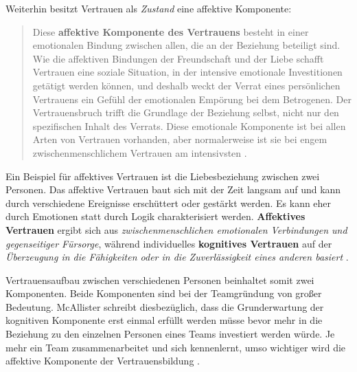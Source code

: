 \documentclass[a4paper,11pt]{article}%
\renewcommand{\\}{\vspace*{0.5\baselineskip} \newline}
\begin{document}
Weiterhin besitzt Vertrauen als \textit{Zustand} eine affektive Komponente:
\begin{quote}
\glqq{}Diese \textbf{affektive Komponente des Vertrauens} besteht in einer emotionalen Bindung zwischen allen, die an der Beziehung beteiligt sind. Wie die affektiven Bindungen der Freundschaft und der Liebe schafft Vertrauen eine soziale Situation, in der intensive emotionale Investitionen getätigt werden können, und deshalb weckt der Verrat eines persönlichen Vertrauens ein Gefühl der emotionalen Empörung bei dem Betrogenen. Der Vertrauensbruch trifft die Grundlage der Beziehung selbst, nicht nur den spezifischen Inhalt des Verrats. Diese emotionale Komponente ist bei allen Arten von Vertrauen vorhanden, aber normalerweise ist sie bei engem zwischenmenschlichem Vertrauen am intensivsten\dq{} \citep[S. 971]{lewis1985trust}.
\end{quote}
Ein Beispiel für affektives Vertrauen ist die Liebesbeziehung zwischen zwei Personen. Das affektive Vertrauen baut sich mit der Zeit langsam auf und kann durch verschiedene Ereignisse erschüttert oder gestärkt werden. Es kann eher durch Emotionen statt durch Logik charakterisiert werden.
\textbf{Affektives Vertrauen} ergibt sich aus \textit{zwischenmenschlichen emotionalen Verbindungen und gegenseitiger Fürsorge}, während individuelles \textbf{kognitives Vertrauen} auf der \textit{Überzeugung in die Fähigkeiten oder in die Zuverlässigkeit eines anderen basiert} \citep[S. 30]{mcallister1995affect}.

Vertrauensaufbau zwischen verschiedenen Personen beinhaltet somit zwei Komponenten. Beide Komponenten sind bei der Teamgründung von großer Bedeutung. 
McAllister schreibt diesbezüglich, dass die Grunderwartung der kognitiven Komponente erst einmal erfüllt werden müsse bevor mehr in die Beziehung zu den einzelnen Personen eines Teams investiert werden würde. Je mehr ein Team zusammenarbeitet und sich kennenlernt, umso wichtiger wird die affektive Komponente der Vertrauensbildung \citep[S. 30]{mcallister1995affect}.
\end{document}
